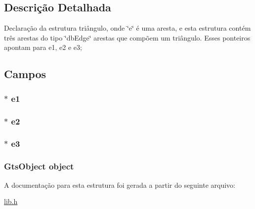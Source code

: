 \subsection{Descrição Detalhada}
Declaração da estrutura triângulo, onde \char`\"{}e\char`\"{} é uma aresta, e esta estrutura contém três arestas do tipo \char`\"{}db\+Edge\char`\"{} arestas que compõem um triângulo. Esses ponteiros apontam para e1, e2 e e3; 

\subsection{Campos}
\subsubsection[{\texorpdfstring{e1}{e1}}]{$\ast$ e1}\hypertarget{structdbTriangle_a038c41bf0720b16e63178f1915b0e455}{}\label{structdbTriangle_a038c41bf0720b16e63178f1915b0e455}
\subsubsection[{\texorpdfstring{e2}{e2}}]{$\ast$ e2}\hypertarget{structdbTriangle_a0b0a41cfaeb4cee2ad5d8578359c61c8}{}\label{structdbTriangle_a0b0a41cfaeb4cee2ad5d8578359c61c8}
\subsubsection[{\texorpdfstring{e3}{e3}}]{$\ast$ e3}\hypertarget{structdbTriangle_a5e66d5366546f4c9cd75c879bd054efd}{}\label{structdbTriangle_a5e66d5366546f4c9cd75c879bd054efd}
\subsubsection[{\texorpdfstring{object}{object}}]{\setlength{\rightskip}{0pt plus 5cm}Gts\+Object object}\hypertarget{structdbTriangle_a4c9ad028a3c5d740f1fc0b15669c1c0f}{}\label{structdbTriangle_a4c9ad028a3c5d740f1fc0b15669c1c0f}


A documentação para esta estrutura foi gerada a partir do seguinte arquivo\+:\begin{DoxyCompactItemize}
\item 
\hyperlink{lib_8h}{lib.\+h}\end{DoxyCompactItemize}

